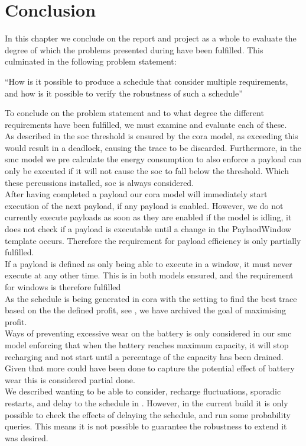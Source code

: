 \chapter{Conclusion} \label{sec:conclusion}
In this chapter we conclude on the report and project as a whole to evaluate the degree of which the problems presented during   have been fulfilled. This culminated in the following problem statement:

\enquote{How is it possible to produce a schedule that consider multiple requirements, and how is it possible to verify the robustness of such a schedule}

To conclude on the problem statement and to what degree the different requirements have been fulfilled, we must examine and evaluate each of these.\\

As described in  the \gls{soc} threshold is ensured by the \gls{cora} model, as exceeding this would result in a deadlock, causing the trace to be discarded. Furthermore, in the \gls{smc} model we pre calculate the energy consumption to also enforce a payload can only be executed if it will not cause the \gls{soc} to fall below the threshold.  Which these percussions installed, \gls{soc} is always considered.\\
After having completed a payload our \gls{cora} model will immediately start execution of the next payload, if any payload is enabled. However, we do not currently execute payloads as soon as they are enabled if the model is idling, it does not check if a payload is executable until a change in the PaylaodWindow template occurs. Therefore the requirement for payload efficiency is only partially fulfilled.\\
If a payload is defined as only being able to execute in a window, it must never execute at any other time. This is in both models ensured, and the requirement for windows is therefore fulfilled \\
As the schedule is being generated in \gls{cora} with the setting to find the best trace based on the the defined profit, see , we have archived the goal of maximising profit.\\
Ways of preventing excessive wear on the battery is only considered in our \gls{smc} model enforcing that when the battery reaches maximum capacity, it will stop recharging and not start until a percentage of the capacity has been drained. Given that more could have been done to capture the potential effect of battery wear this is considered partial done. \\
We described wanting to be able to consider, recharge fluctuations, sporadic restarts, and delay to the schedule in . However, in the current build it is only possible to check the effects of delaying the schedule, and run some probability queries. This means it is not possible to guarantee the robustness to extend it was desired.

